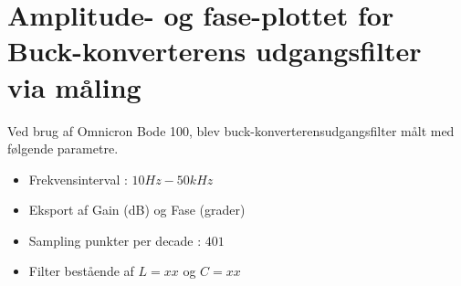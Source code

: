 \section{Amplitude- og fase-plottet for Buck-konverterens udgangsfilter via måling}\label{sec:spm2}
Ved brug af Omnicron Bode 100, blev buck-konverterensudgangsfilter målt med følgende parametre.
\begin{itemize}
	\item Frekvensinterval : $ 10 Hz - 50 kHz  $
	\item Eksport af Gain (dB) og Fase (grader)
	\item Sampling punkter per decade : $401$
	\item Filter bestående af $L=xx$ og $C=xx $
\end{itemize}

